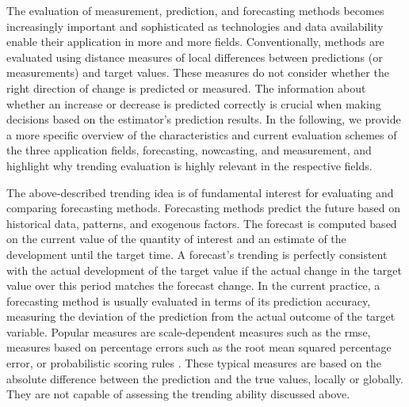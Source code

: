 The evaluation of measurement, prediction, and forecasting methods becomes increasingly important and sophisticated as technologies and data availability enable their application in more and more fields. 
Conventionally, methods are evaluated using distance measures of local differences between predictions (or measurements) and target values. 
These measures do not consider whether the right direction of change is predicted or measured.
The information about whether an increase or decrease is predicted correctly is crucial when making decisions based on the estimator's prediction results. 
In the following, we provide a more specific overview of the characteristics and current evaluation schemes of the three application fields, forecasting, nowcasting, and measurement, and highlight why trending evaluation is highly relevant in the respective fields.

The above-described trending idea is of fundamental interest for evaluating and comparing forecasting methods. 
Forecasting methods predict the future based on historical data, patterns, and exogenous factors. 
The forecast is computed based on the current value of the quantity of interest and an estimate of the development until the target time.
A forecast's trending is perfectly consistent with the actual development of the target value if the actual change in the target value over this period matches the forecast change. 
In the current practice, a forecasting method is usually evaluated in terms of its prediction accuracy, measuring the deviation of the prediction from the actual outcome of the target variable. 
Popular measures are scale-dependent measures such as the \ac{rmse}, measures based on percentage errors such as the root mean squared percentage error, or probabilistic scoring rules \textcite[see the review in][]{hyndman2006another}. 
These typical measures are based on the absolute difference between the prediction and the true values, locally or globally. 
They are not capable of assessing the trending ability discussed above.

